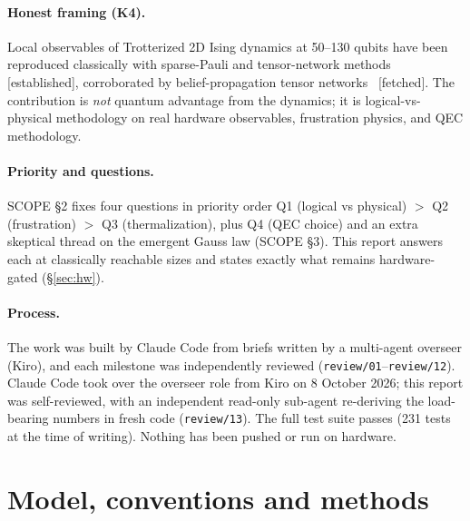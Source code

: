 \documentclass[11pt,a4paper]{article}
\newcommand{\tg}[1]{\textsf{\small[#1]}}
\newcommand{\est}{\tg{established}}
\newcommand{\code}[1]{\nolinkurl{#1}}
\begin{document}
\paragraph{Honest framing (K4).} Local observables of Trotterized 2D Ising dynamics at 50--130 qubits have been
reproduced classically with sparse-Pauli and tensor-network methods~\cite{begusic} \est{}, corroborated by
belief-propagation tensor networks~\cite{tindall} \tg{fetched}. The contribution is
\emph{not} quantum advantage from the dynamics; it is logical-vs-physical methodology on real hardware
observables, frustration physics, and QEC methodology.

\paragraph{Priority and questions.} SCOPE \S2 fixes four questions in priority order Q1 (logical vs physical) $>$
Q2 (frustration) $>$ Q3 (thermalization), plus Q4 (QEC choice) and an extra skeptical thread on the emergent
Gauss law (SCOPE \S3). This report answers each at classically reachable sizes and states exactly what remains
hardware-gated (\S\ref{sec:hw}).

\paragraph{Process.} The work was built by Claude Code from briefs written by a multi-agent overseer (Kiro), and
each milestone was independently reviewed (\code{review/01}--\code{review/12}). Claude Code took over the
overseer role from Kiro on 8 October 2026; this report was self-reviewed, with an independent read-only sub-agent
re-deriving the load-bearing numbers in fresh code (\code{review/13}). The full test suite passes (231 tests at
the time of writing). Nothing has been pushed or run on hardware.

\section{Model, conventions and methods}\label{sec:methods}
\end{document}
